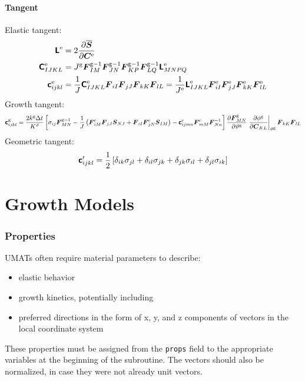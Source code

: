 \documentclass[10pt,letterpaper,oneside]{report}
\newcommand{\ten}[1]{\mbox{\boldmath $#1$}{}}
\newcommand{\tenf}[1]{\mbox{{\sffamily{\bfseries {#1}}}}}
\newcommand{\scas}[1]{\mbox{{\scriptsize{${\rm{#1}}$}}}{}}
\begin{document}
\begin{itemize}
\subsubsection{Tangent}
Elastic tangent:
\begin{align}
\tenf{L}^{\scas{e}} ={}& 2 \frac{\partial \overline{\ten{S}}}{\partial \ten{C}^{\scas{e}}} 
\\
\tenf{C}^{\scas{e}}_{IJKL} ={}& J^{\scas{g}} \ten{F}^{\scas{g}-1}_{IM} \ten{F}^{\scas{g}-1}_{JN} \ten{F}^{\scas{g}-1}_{KP} \ten{F}^{\scas{g}-1}_{LQ} \tenf{L}^{\scas{e}}_{MNPQ} 
\\ 
\tenf{c}^{\scas{e}}_{ijkl} ={}& \frac{1}{J} \tenf{C}^{\scas{e}}_{IJKL} \ten{F}_{iI} \ten{F}_{jJ} \ten{F}_{kK} \ten{F}_{lL} = \frac{1}{J^{\scas{e}}} \tenf{L}^{\scas{e}}_{IJKL} \ten{F}^{\scas{e}}_{iI} \ten{F}^{\scas{e}}_{jJ} \ten{F}^{\scas{e}}_{kK} \ten{F}^{\scas{e}}_{lL} 
\end{align}
Growth tangent:
\begin{equation}
\tenf{c}^{\scas{g}}_{ijkl} = \frac{2 k^{\scas{g}} \Delta t}{K^\vartheta} \left[ \sigma_{ij} \ten{F}^{\scas{g}-1}_{MN} 
- \frac{1}{J} \left( \ten{F}^{\scas{e}}_{iM} \ten{F}_{jJ} \ten{S}_{NJ} + \ten{F}_{iI} \ten{F}^{\scas{e}}_{jN} \ten{S}_{IM} \right)
- \tenf{c}^{\scas{e}}_{ijmn} \ten{F}^{\scas{e}}_{mM} \ten{F}^{-1}_{Nn} \right] 
\frac{\partial \ten{F}^{\scas{g}}_{MN}}{\partial \vartheta^{\scas{g}}} \left. \frac{\partial \phi^{\scas{g}} }{\partial \ten{C}_{KL}} \right|_{\vartheta^{\scas{g}}} \ten{F}_{kK} \ten{F}_{lL} 
\end{equation}
Geometric tangent:
\begin{equation}
\tenf{c}'_{ijkl} = \frac{1}{2} \left[ \delta_{ik}\sigma_{jl} + \delta_{il}\sigma_{jk} + \delta_{jk}\sigma_{il} + \delta_{jl}\sigma_{ik} \right]  
\end{equation}

\chapter{Growth Models}
\label{chap:growth_models}

\subsection{Properties}
UMATs often require material parameters to describe: 
\begin{itemize}
\item elastic behavior
\item growth kinetics, potentially including
\item preferred directions in the form of x, y, and z components of vectors in the local coordinate system
\end{itemize}
These properties must be assigned from the \texttt{props} field to the appropriate variables at the beginning of the subroutine.  The vectors should also be normalized, in case they were not already unit vectors.  


\end{itemize}
\end{document}
